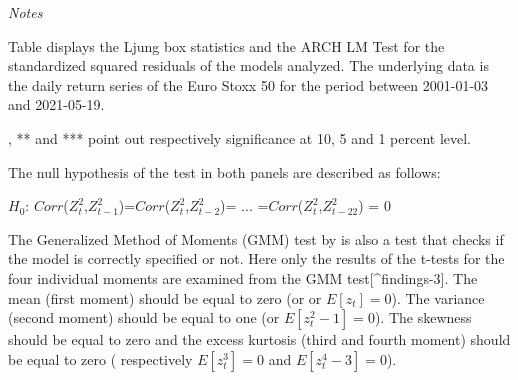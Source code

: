 \documentclass[a4paper, nobind]{templates/ociamthesis}
\begin{document}
\begin{landscape}
\begin{table}[h!]
\begin{threeparttable}
{\begin{tabular}[t]{lllllllll}
\bottomrule
\end{tabular}}
\begin{tablenotes}
\item \textit{Notes} 
\item Table displays the Ljung box statistics and the ARCH LM Test for the standardized squared residuals of the models analyzed. The underlying data is the daily return series of the Euro Stoxx 50 for the period between 2001-01-03 and 2021-05-19.
\item *, ** and *** point out respectively significance at 10, 5 and 1 percent level.
\item The null hypothesis of the test in both panels are described as follows:
\item $H_0$: $Corr$($Z_t^2$,$Z_{t-1}^2$)=$Corr$($Z_t^2$,$Z_{t-2}^2$)= $...$ =$Corr$($Z_t^2$,$Z_{t-22}^2$) = $0$
\end{tablenotes}
\end{threeparttable}
\end{table}
\end{landscape}

\noindent The Generalized Method of Moments (GMM) test by \textcite{hansen1982} is also a test that checks if the model is correctly specified or not. Here only the results of the t-tests for the four individual moments are examined from the GMM test{[}\^{}findings-3{]}. The mean (first moment) should be equal to zero (or or \(E\left[z_{t}\right]=0\)). The variance (second moment) should be equal to one (or \(E\left[z_{t}^2-1\right]=0\)). The skewness should be equal to zero and the excess kurtosis (third and fourth moment) should be equal to zero ( respectively \(E\left[z_{t}^3\right]=0\) and \(E\left[z_{t}^4-3\right] = 0\)).
\end{document}
